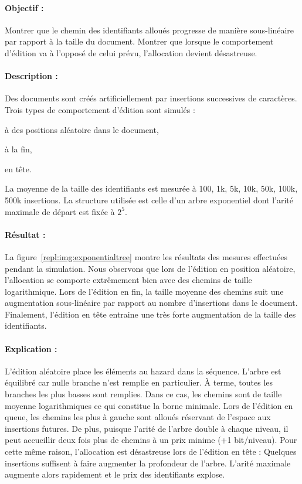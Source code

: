 \paragraph{Objectif :} Montrer que le chemin des identifiants alloués progresse
de manière sous-linéaire par rapport à la taille du document. Montrer que
lorsque le comportement d'édition va à l'opposé de celui prévu, l'allocation
devient désastreuse.

\paragraph{Description :} Des documents sont créés artificiellement par
insertions successives de caractères. Trois types de comportement d'édition sont
simulés :
\begin{inparaenum}[(i)]
\item à des positions aléatoire dans le document,
\item à la fin,
\item en tête.
\end{inparaenum}
La moyenne de la taille des identifiants est mesurée à 100, 1k, 5k, 10k, 50k,
100k, 500k insertions. La structure utilisée est celle d'un arbre exponentiel
dont l'arité maximale de départ est fixée à $2^5$.

\paragraph{Résultat :} La figure~\ref{repl:img:exponentialtree} montre les
résultats des mesures effectuées pendant la simulation. Nous observons que lors
de l'édition en position aléatoire, l'allocation se comporte extrêmement bien
avec des chemins de taille logarithmique. Lors de l'édition en fin, la taille
moyenne des chemins suit une augmentation sous-linéaire par rapport au nombre
d'insertions dans le document. Finalement, l'édition en tête entraine une très
forte augmentation de la taille des identifiants.

\paragraph{Explication :} L'édition aléatoire place les éléments au hazard dans
la séquence. L'arbre est équilibré car nulle branche n'est remplie en
particulier. À terme, toutes les branches les plus basses sont remplies. Dans ce
cas, les chemins sont de taille moyenne logarithmiques ce qui constitue la borne
minimale. Lors de l'édition en queue, les chemins les plus à gauche sont alloués
réservant de l'espace aux insertions futures. De plus, puisque l'arité de
l'arbre double à chaque niveau, il peut accueillir deux fois plus de chemins à
un prix minime (+1 bit/niveau). Pour cette même raison, l'allocation est
désastreuse lors de l'édition en tête : Quelques insertions suffisent à faire
augmenter la profondeur de l'arbre. L'arité maximale augmente alors rapidement
et le prix des identifiants explose.



